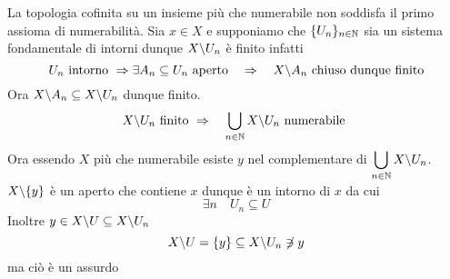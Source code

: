 \begin{oss} La topologia cofinita su un insieme più che numerabile non soddisfa il primo assioma di numerabilit\`a.
\proof Sia $x\in X$ e supponiamo che $\displaystyle \{ U_n\}_{n \in \mathbb{N}}$ sia un sistema fondamentale di intorni dunque $ X\backslash U_n $ \`e finito infatti 
$$U_n \text{ intorno } \Rightarrow \exists A_n \subseteq U_n\text{ aperto} \quad \Rightarrow \quad X\backslash A_n \text{ chiuso dunque finito}$$
Ora $ X\backslash A_n \subseteq X\backslash U_n$ dunque finito.\\
$$ X\backslash U_n \text{ finito } \Rightarrow \quad \bigcup_{n \in \mathbb{N}} X \backslash U_n \text{ numerabile }$$
Ora essendo $X$ pi\`u che numerabile esiste $y$ nel complementare di $\displaystyle \bigcup_{n\in \mathbb{N}} X \backslash U_n$.\\
$X\backslash \{ y\}$ \`e un aperto che contiene $x$ dunque  \`e un intorno di $x$ da cui 
$$ \exists n \quad U_n \subseteq U$$
Inoltre $y\in X\backslash U \subseteq X\backslash U_n$ \\
$$ X\backslash U =\{y \}\subseteq X\backslash U_n \not \ni  y$$
ma ci\`o \`e un assurdo
\end{oss}
\newpage
